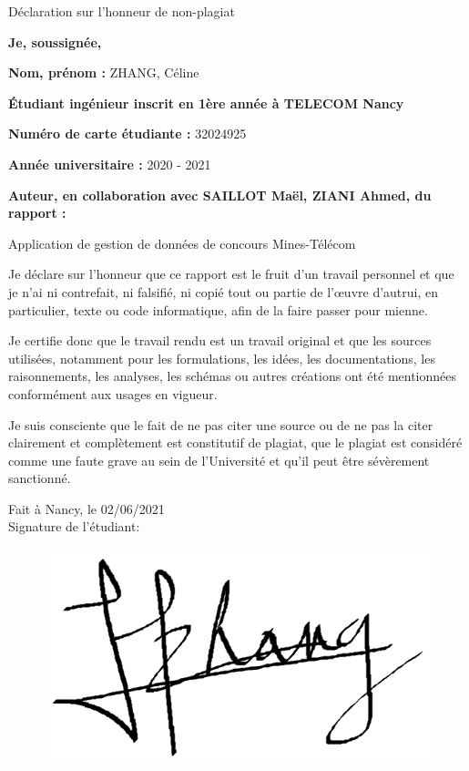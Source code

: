 

%

\begin{center}
\LARGE
    Déclaration sur l'honneur de non-plagiat
\end{center}

\textbf{Je, soussignée,} 

\textbf{Nom, prénom :} ZHANG, Céline

\textbf{Étudiant ingénieur inscrit en 1ère année à TELECOM Nancy} 

\textbf{Numéro de carte étudiante :} 32024925

\textbf{Année universitaire :} 2020 - 2021 

\textbf{Auteur, en collaboration avec SAILLOT Maël, ZIANI Ahmed, du rapport : } 

\begin{center}
\Large
    Application de gestion de données de concours Mines-Télécom 
\end{center}


Je déclare sur l’honneur que ce rapport est le fruit d’un travail personnel et que je n’ai ni contrefait, ni falsifié, ni copié tout ou partie de l’œuvre d’autrui, en particulier, texte ou code informatique, afin de la faire passer pour mienne.

Je certifie donc que le travail rendu est un travail original et que les sources utilisées, notamment pour les formulations, les idées, les documentations, les raisonnements, les analyses, les schémas ou autres créations ont été mentionnées conformément aux usages en vigueur.

Je suis consciente que le fait de ne pas citer une source ou de ne pas la citer clairement et complètement est constitutif de plagiat, que le plagiat est considéré comme une faute grave au sein de l’Université et qu’il peut être sévèrement sanctionné. \\


\begin{flushright}
Fait à Nancy, le 02/06/2021 \\
Signature de l'étudiant:
\end{flushright}
\begin{figure}[!h]
    \begin{flushright}
        \includegraphics[scale=0.35]{Images/Signatures/Signature_CZ.png}
    \end{flushright}
\end{figure}